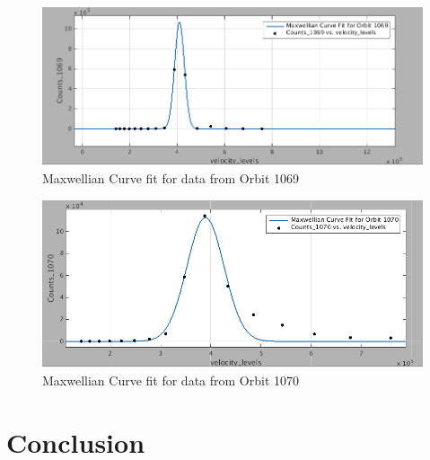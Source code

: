 \documentclass{article}
\begin{document}
\begin{figure}[!ht]
\centering
\includegraphics[scale=0.45]{Figures/curvefit_1069.png}
\caption{Maxwellian Curve fit for data from Orbit 1069}
\label{fig:curvefit_1069}
\end{figure}

\begin{figure}
\centering
\includegraphics[scale= 0.45]{Figures/curvefit_1070.png}
\caption{Maxwellian Curve fit for data from Orbit 1070}
\label{fig:curvefit_1070}
\end{figure}

\clearpage

\section{Conclusion}
\end{document}
